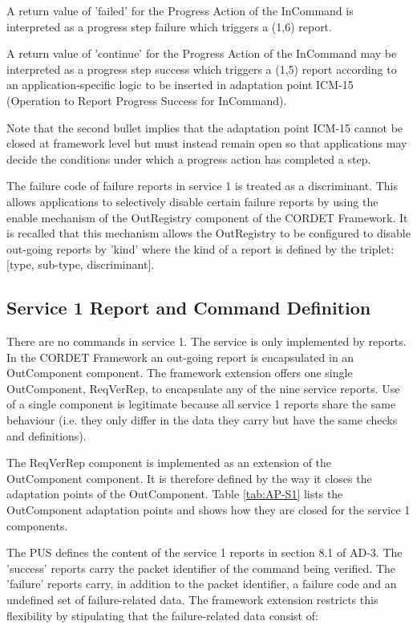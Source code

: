 \documentclass{pnp_article}
\begin{document}
\begin{fw_itemize}
\item A return value of 'failed' for the Progress Action of the InCommand is interpreted as a progress step failure which triggers a (1,6) report. 
\item A return value of 'continue' for the Progress Action of the InCommand may be interpreted as a progress step success which triggers a (1,5) report according to an application-specific logic to be inserted in adaptation point ICM-15 (Operation to Report Progress Success for InCommand). 
\end{fw_itemize}

Note that the second bullet implies that the adaptation point ICM-15 cannot be closed at framework level but must instead remain open so that applications may decide the conditions under which a progress action has completed a step.

The failure code of failure reports in service 1 is treated as a discriminant. This allows applications to selectively disable certain failure reports by using the enable mechanism of the OutRegistry component of the CORDET Framework. It is recalled that this mechanism allows the OutRegistry to be configured to disable out-going reports by 'kind' where the kind of a report is defined by the triplet: [type, sub-type, discriminant]. 


\subsection{Service 1 Report and Command Definition}\label{sec:serv1RepDef}
There are no commands in service 1. The service is only implemented by reports. In the CORDET Framework an out-going report is encapsulated in an OutComponent component. The framework extension offers one single OutComponent, ReqVerRep, to encapsulate any of the nine service reports. Use of a single component is legitimate because all service 1 reports share the same behaviour (i.e. they only differ in the data they carry but have the same checks and definitions).

The ReqVerRep component is implemented as an extension of the OutComponent component. It is therefore defined by the way it closes the adaptation points of the OutComponent. Table \ref{tab:AP-S1} lists the OutComponent adaptation points and shows how they are closed for the service 1 components.

The PUS defines the content of the service 1 reports in section 8.1 of AD-3. The 'success' reports carry the packet identifier of the command being verified. The 'failure' reports carry, in addition to the packet identifier, a failure code and an undefined set of failure-related data. The framework extension restricts this flexibility by stipulating that the failure-related data consist of: 
\end{document}

